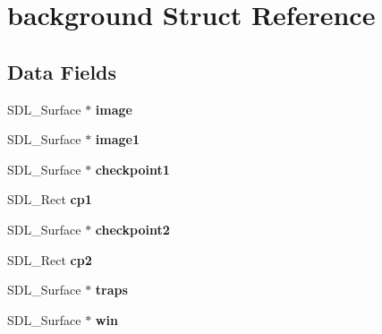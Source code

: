 \hypertarget{structbackground}{}\section{background Struct Reference}
\label{structbackground}
\subsection*{Data Fields}
\begin{DoxyCompactItemize}
\item 
S\+D\+L\+\_\+\+Surface $\ast$ {\bfseries image}\hypertarget{structbackground_a321e7102a3c80e33d40a276f09b8e3f6}{}\label{structbackground_a321e7102a3c80e33d40a276f09b8e3f6}

\item 
S\+D\+L\+\_\+\+Surface $\ast$ {\bfseries image1}\hypertarget{structbackground_a383993cef3e7438fbd6b11f1b2b40b3b}{}\label{structbackground_a383993cef3e7438fbd6b11f1b2b40b3b}

\item 
S\+D\+L\+\_\+\+Surface $\ast$ {\bfseries checkpoint1}\hypertarget{structbackground_a85541518908a04c627087ad7aaf52b0f}{}\label{structbackground_a85541518908a04c627087ad7aaf52b0f}

\item 
S\+D\+L\+\_\+\+Rect {\bfseries cp1}\hypertarget{structbackground_acd1460099638e81dc1dbcff38db97ade}{}\label{structbackground_acd1460099638e81dc1dbcff38db97ade}

\item 
S\+D\+L\+\_\+\+Surface $\ast$ {\bfseries checkpoint2}\hypertarget{structbackground_a21365a26147b3d4e257eef58ed368082}{}\label{structbackground_a21365a26147b3d4e257eef58ed368082}

\item 
S\+D\+L\+\_\+\+Rect {\bfseries cp2}\hypertarget{structbackground_ab79b3c0a246650c2f5cd7c6613edcb13}{}\label{structbackground_ab79b3c0a246650c2f5cd7c6613edcb13}

\item 
S\+D\+L\+\_\+\+Surface $\ast$ {\bfseries traps}\hypertarget{structbackground_aaa1e151b245173a5e77f6a3a3a5c37ef}{}\label{structbackground_aaa1e151b245173a5e77f6a3a3a5c37ef}

\item 
S\+D\+L\+\_\+\+Surface $\ast$ {\bfseries win}\hypertarget{structbackground_ab61ca008f371cdf1ba9f8e80238df001}{}\label{structbackground_ab61ca008f371cdf1ba9f8e80238df001}


\end{DoxyCompactItemize}
